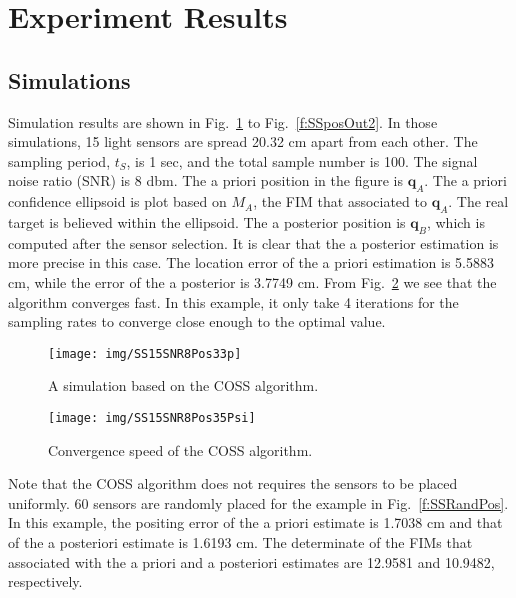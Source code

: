 \section{Experiment Results}\label{s:experiment}
\subsection{Simulations}\label{s:sim}
Simulation results are shown in Fig.~\ref{f:SSpos35No3} to Fig.~\ref{f:SSposOut2}. In those simulations, 15 light sensors are spread 20.32 cm apart from each other. The sampling period, $t_S$, is 1 sec, and the total sample number is 100. The signal noise ratio (SNR) is    8 dbm. The a priori position in the figure is $\mathbf{q}_A$. The a priori confidence ellipsoid is plot based on $M_A$, the FIM that associated to $\mathbf{q}_A$. The real target is believed within the ellipsoid. The a posterior position is $\mathbf{q}_B$, which is computed after the sensor selection. It is clear that the a posterior estimation is more precise in this case. The location error of the a priori estimation is 5.5883 cm, while the error of the a posterior is 3.7749 cm. From Fig.~\ref{f:SSpos35psiNo3} we see that the algorithm converges fast. In this example, it only take 4 iterations for the sampling rates to converge close enough to the optimal value.


\begin{figure}
  \centering
  \texttt{[image: img/SS15SNR8Pos33p]}
  \caption{A simulation based on the COSS algorithm.}\label{f:SSpos35No3}
\end{figure}

\begin{figure}
  \centering
  \texttt{[image: img/SS15SNR8Pos35Psi]}
  \caption{Convergence speed of the COSS algorithm.}\label{f:SSpos35psiNo3}
\end{figure}


Note that the COSS algorithm does not requires the sensors to be placed uniformly. 60 sensors are randomly placed for the example in Fig.~\ref{f:SSRandPos}. In this example, the positing error of the a priori estimate is 1.7038 cm and that of the a posteriori estimate is 1.6193 cm. The determinate of the FIMs that associated with the a priori and a posteriori estimates are 12.9581 and 10.9482, respectively.

